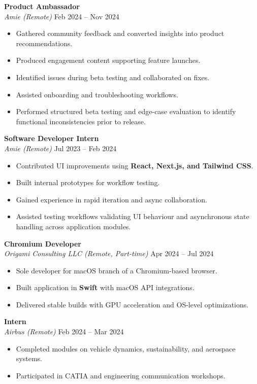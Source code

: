 \documentclass[a4paper,10pt]{article}
\begin{document}
\textbf{Product Ambassador}\\
\emph{Amie (Remote)} \hfill Feb 2024 -- Nov 2024
\begin{itemize}[leftmargin=*]
    \item Gathered community feedback and converted insights into product recommendations.
    \item Produced engagement content supporting feature launches.
    \item Identified issues during beta testing and collaborated on fixes.
    \item Assisted onboarding and troubleshooting workflows.
    \item Performed structured beta testing and edge-case evaluation to identify functional inconsistencies prior to release.
\end{itemize}

\textbf{Software Developer Intern}\\
\emph{Amie (Remote)} \hfill Jul 2023 -- Feb 2024
\begin{itemize}[leftmargin=*]
    \item Contributed UI improvements using \textbf{React, Next.js, and Tailwind CSS}.
    \item Built internal prototypes for workflow testing.
    \item Gained experience in rapid iteration and async collaboration.
    \item Assisted testing workflows validating UI behaviour and asynchronous state handling across application modules.
\end{itemize}

\textbf{Chromium Developer}\\
\emph{Origami Consulting LLC (Remote, Part-time)} \hfill Apr 2024 -- Jul 2024
\begin{itemize}[leftmargin=*]
    \item Sole developer for macOS branch of a Chromium-based browser.
    \item Built application in \textbf{Swift} with macOS API integrations.
    \item Delivered stable builds with GPU acceleration and OS-level optimizations.
\end{itemize}

\textbf{Intern}\\
\emph{Airbus (Remote)} \hfill Feb 2024 -- Mar 2024
\begin{itemize}[leftmargin=*]
    \item Completed modules on vehicle dynamics, sustainability, and aerospace systems.
    \item Participated in CATIA and engineering communication workshops.
\end{itemize}
\end{document}
